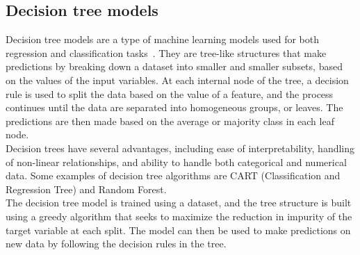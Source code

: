     \subsection{Decision tree models} \label{sec:longlp}
    Decision tree models are a type of machine learning models used for both regression and classification tasks~\cite{Kotsiantis}. They are tree-like structures that
    make predictions by breaking down a dataset into smaller and smaller subsets, based on the values of the input variables. At each internal
    node of the tree, a decision rule is used to split the data based on the value of a feature, and the process continues until the data are separated
    into homogeneous groups, or leaves. The predictions are then made based on the average or majority class in each leaf node.
    \\
    Decision trees have several advantages, including ease of interpretability, handling of non-linear relationships, and ability to handle both
    categorical and numerical data. Some examples of decision tree algorithms are CART (Classification and Regression Tree) and Random Forest.
    \\
    The decision tree model is trained using a dataset, and the tree structure is built using a greedy algorithm that seeks to maximize
    the reduction in impurity of the target variable at each split. The model can then be used to make predictions on new data by following
    the decision rules in the tree.

